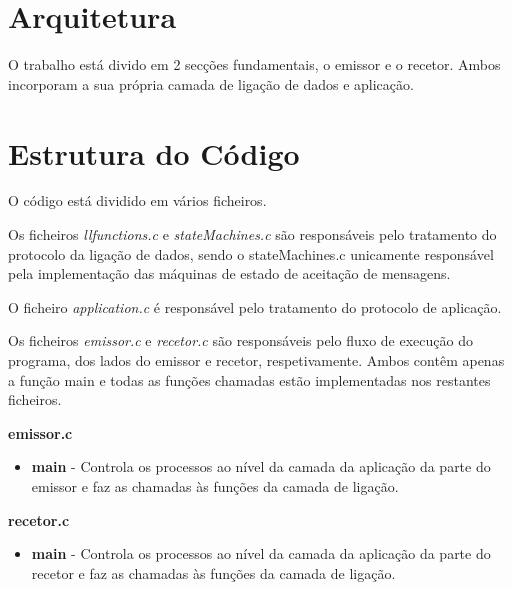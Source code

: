 \documentclass[11pt]{article}
\begin{document}
\section{Arquitetura}
O trabalho está divido em 2 secções fundamentais, o emissor e o recetor. Ambos incorporam a sua própria camada de ligação de dados e aplicação.

\section{Estrutura do Código}
O código está dividido em vários ficheiros.

Os ficheiros \textit{llfunctions.c} e \textit{stateMachines.c} são responsáveis pelo tratamento do protocolo da ligação de dados, sendo o  stateMachines.c unicamente responsável pela implementação das máquinas de estado de aceitação de mensagens.

O ficheiro \textit{application.c} é responsável pelo tratamento do protocolo de aplicação.

Os ficheiros \textit{emissor.c} e \textit{recetor.c} são responsáveis pelo fluxo de execução do programa, dos lados do emissor e recetor, respetivamente. Ambos contêm apenas a função main e todas as funções chamadas estão implementadas nos restantes ficheiros.


\textbf{emissor.c}
\begin{itemize}
	\item \textbf{main} - Controla os processos ao nível da camada da aplicação da parte do emissor e faz as chamadas às funções da camada de ligação.
\end{itemize}


\textbf{recetor.c}
\begin{itemize}
	\item \textbf{main} - Controla os processos ao nível da camada da aplicação da parte do recetor e faz as chamadas às funções da camada de ligação.
\end{itemize}
\end{document}
